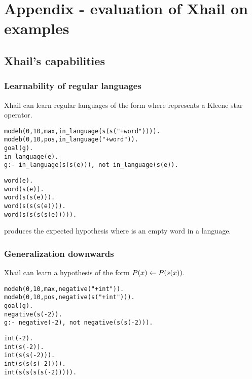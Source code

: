 \chapter{Appendix - evaluation of Xhail on examples}\label{appendix_xhail}
\section{Xhail's capabilities}

\subsection{Learnability of regular languages}\label{xhail_learnability_regular_languages}
Xhail can learn regular languages of the form  where \tc{*} represents a Kleene star operator.

\begin{minipage}[t]{.70\textwidth}
\begin{lstlisting}
modeh(0,10,max,in_language(s(s("+word")))).
modeb(0,10,pos,in_language("+word")).
goal(g).
in_language(e).
g:- in_language(s(s(e))), not in_language(s(e)).
\end{lstlisting}
\end{minipage}
\begin{minipage}[t]{.20\textwidth}
\begin{lstlisting}
word(e).
word(s(e)).
word(s(s(e))).
word(s(s(s(e)))).
word(s(s(s(s(e))))).
\end{lstlisting}
\end{minipage}

produces the expected hypothesis  where  is an empty word in a language.

\subsection{Generalization downwards}\label{xhail_generalization_downwards}
Xhail can learn a hypothesis of the form $P(x) \leftarrow P(s(x))$.

\begin{minipage}[t]{.60\textwidth}
\begin{lstlisting}
modeh(0,10,max,negative("+int")).
modeb(0,10,pos,negative(s("+int"))).
goal(g).
negative(s(-2)).
g:- negative(-2), not negative(s(s(-2))).
\end{lstlisting}
\end{minipage}
\begin{minipage}[t]{.20\textwidth}
\begin{lstlisting}
int(-2).
int(s(-2)).
int(s(s(-2))).
int(s(s(s(-2)))).
int(s(s(s(s(-2))))).
\end{lstlisting}
\end{minipage}


